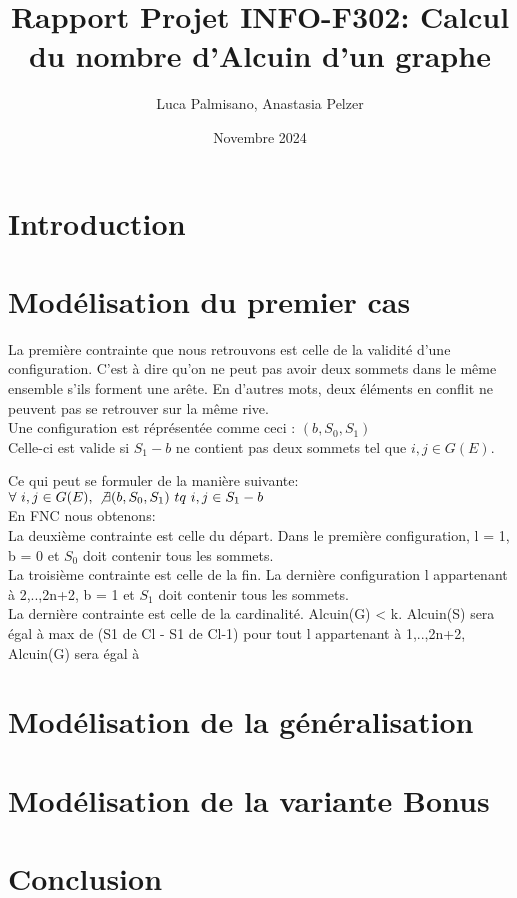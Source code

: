 \documentclass{article}
\title{Rapport Projet INFO-F302: Calcul du nombre d'Alcuin  d'un graphe}
\author{Luca Palmisano, Anastasia Pelzer}
\date{Novembre 2024}
\begin{document}
\maketitle

\section{Introduction}

\section{Modélisation du premier cas}

La première contrainte que nous retrouvons est celle de la validité d'une configuration. C'est à dire qu'on ne peut pas avoir deux sommets dans le même ensemble s'ils forment une arête. En d'autres mots, deux éléments en conflit ne peuvent pas se retrouver sur la même rive.\\

Une configuration est réprésentée comme ceci : \((b, S_0, S_1)\) \\

Celle-ci est valide si \(S_1-b\) ne contient pas deux sommets tel que \({i,j} \in G(E)\).

Ce qui peut se formuler de la manière suivante:\\

\(\forall\  i,j \in G(E),\  \not\exists  (b, S_0, S_1)\  tq\  i,j \in S_1-b\)\\

En FNC nous obtenons:\\

La deuxième contrainte est celle du départ. Dans le première configuration, l = 1, b = 0 et \(S_0\) doit contenir tous les sommets.\\

La troisième contrainte est celle de la fin. La dernière configuration l appartenant à {2,..,2n+2}, b = 1 et \(S_1\) doit contenir tous les sommets.\\

La dernière contrainte est celle de la cardinalité. Alcuin(G) < k.
Alcuin(S) sera égal à max de (S1 de Cl - S1 de Cl-1) pour tout l appartenant à {1,..,2n+2}, Alcuin(G) sera égal à 






\section{Modélisation de la généralisation}

\section{Modélisation de la variante Bonus}

\section{Conclusion}
\end{document}
